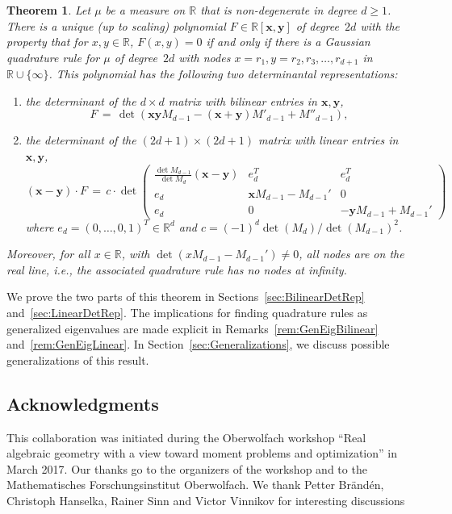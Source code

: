 \documentclass[11pt]{article}
\newtheorem{theo}{Theorem}[section]
\theoremstyle{definition}
\numberwithin{equation}{section}
\numberwithin{figure}{section}
\numberwithin{table}{section}
\newcommand\R{\mathbb R}
\newcommand\x{\mathbf{x}}
\newcommand\y{\mathbf{y}}
\newcommand*{\alphenumi}{\renewcommand*{\theenumi}{\alph{enumi}}}
\begin{document}
\begin{theo}\label{thm:main}
Let $\mu$ be a measure on $\R$ that is non-degenerate in degree $d\geq1$. There is a unique (up to scaling) polynomial $F\in \R[\x,\y]$ of degree~$2d$ with the property that for $x,y\in \R$, $F(x,y)=0$ if and only if there is a Gaussian quadrature rule for $\mu$ of degree~$2d$ with nodes $x=r_1,y=r_2,r_3, \hdots, r_{d+1} $ in $ \R\cup \{\infty\}$. This polynomial has the following two determinantal representations:
\begin{enumerate}\alphenumi
\item \label{list1.4.1}the determinant of the $d\times d$ matrix with bilinear entries in $\x,\y$,
\[
F \, = \, \det\left(\x\y M_{d-1} - (\x+\y)M'_{d-1} + M''_{d-1}\right),
\]
\item \label{list1.4.2}the determinant of the $(2d+1)\times (2d+1)$ matrix with linear entries in $\x,\y$,
\[
(\x-\y) \cdot F \, = \, c\cdot \det
\begin{pmatrix}
\frac{\det M_{d-1}}{\det M_d} (\x-\y) &e_d^T&e_d^T\\
e_d&\x M_{d-1}-M_{d-1}'&0\\
e_d&0&-\y M_{d-1}+M_{d-1}'
\end{pmatrix}
\]
where $e_d=(0,\ldots,0,1)^T\in\mathbb{R}^d$ and $c=(-1)^d \det(M_d)/\det(M_{d-1})^2$.
\end{enumerate}
Moreover, for all $x\in \R$, with $\det(x M_{d-1} -M_{d-1}')\neq 0$, all nodes are on the real line, i.e., the associated quadrature rule has no nodes at infinity.
\end{theo}

We prove the two parts of this theorem in Sections~\ref{sec:BilinearDetRep} and~\ref{sec:LinearDetRep}. The implications for finding quadrature rules as generalized eigenvalues are made explicit in Remarks~\ref{rem:GenEigBilinear} and~\ref{rem:GenEigLinear}. In Section~\ref{sec:Generalizations}, we discuss possible generalizations of this result.

\subsection*{Acknowledgments}
This collaboration was initiated during the Oberwolfach workshop ``Real algebraic geometry with a view toward moment problems and optimization'' in March 2017. Our thanks go to the organizers of the workshop and to the Mathematisches Forschungsinstitut Oberwolfach. We thank Petter Br\"andén, Christoph Hanselka, Rainer Sinn and Victor Vinnikov for interesting discussions
\end{document}
